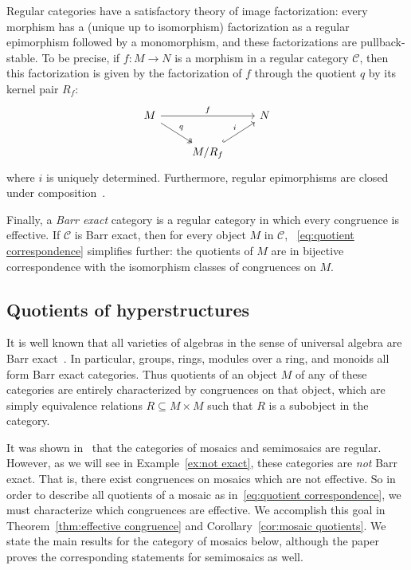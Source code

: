 \documentclass[reqno]{amsart}
\newcommand{\C}{\mathcal{C}}
\numberwithin{equation}{section}
\theoremstyle{plain}
\theoremstyle{definition}
\begin{document}
Regular categories have a satisfactory theory of image factorization: every morphism has a (unique up to isomorphism) factorization as a regular epimorphism followed by a monomorphism, and these factorizations are pullback-stable. 
To be precise, if $f \colon M \to N$ is a morphism in a regular category $\C$, then this factorization is given by the factorization of $f$ through the quotient $q$ by its kernel pair $R_f$:
\begin{equation}\label{eq:epimono}
\begin{tikzcd}
M \ar[rr, "f"] \ar[dr, twoheadrightarrow, "q"]& & N \\
& M/R_f \ar[ur, hookrightarrow, "i"] &
\end{tikzcd}
\end{equation}
where $i$ is uniquely determined. Furthermore, regular epimorphisms are closed under composition~\cite[Corollary~2.23]{BournGran}.

Finally, a \emph{Barr exact} category is a regular category in which every congruence is effective. If $\C$ is Barr exact, then for every object $M$ in $\C$, ~\eqref{eq:quotient correspondence} simplifies further: the quotients of $M$ are in bijective correspondence with the isomorphism classes of congruences on $M$. 

\subsection{Quotients of hyperstructures}

It is well known that all varieties of algebras in the sense of universal algebra are Barr exact~\cite[Example~A.5.16]{BorceuxBorn}. In particular, groups, rings, modules over a ring, and monoids all form Barr exact categories. Thus quotients of an object $M$ of any of these categories are entirely characterized by congruences on that object, which are simply equivalence relations $R \subseteq M \times M$ such that $R$ is a subobject in the category. 


It was shown in~\cite[Theorem~1.2]{NakamuraReyes} that the categories of mosaics and semimosaics are regular. 
However, as we will see in Example~\ref{ex:not exact}, these categories are \emph{not} Barr exact. That is, there exist congruences on mosaics which are not effective.
So in order to describe all quotients of a mosaic as in~\eqref{eq:quotient correspondence}, we must characterize which congruences are effective. We accomplish this goal in
Theorem~\ref{thm:effective congruence} and Corollary~\ref{cor:mosaic quotients}. We state the main results for the category of mosaics below, although the paper proves the corresponding statements for semimosaics as well. 
\end{document}
